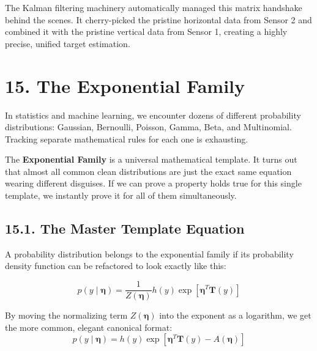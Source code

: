 \documentclass{article}
\begin{document}
The Kalman filtering machinery automatically managed this matrix handshake behind the scenes. It cherry-picked the pristine horizontal data from Sensor 2 and combined it with the pristine vertical data from Sensor 1, creating a highly precise, unified target estimation.

\section*{15. The Exponential Family}

In statistics and machine learning, we encounter dozens of different probability distributions: Gaussian, Bernoulli, Poisson, Gamma, Beta, and Multinomial. Tracking separate mathematical rules for each one is exhausting. 

The \textbf{Exponential Family} is a universal mathematical template. It turns out that almost all common clean distributions are just the exact same equation wearing different disguises. If we can prove a property holds true for this single template, we instantly prove it for all of them simultaneously.

\subsection*{15.1. The Master Template Equation}
A probability distribution belongs to the exponential family if its probability density function can be refactored to look exactly like this:

\begin{equation}
p(y \mid \boldsymbol{\eta}) = \frac{1}{Z(\boldsymbol{\eta})} h(y) \exp\left[ \boldsymbol{\eta}^T \mathbf{T}(y) \right] \tag{76}
\end{equation}

By moving the normalizing term $Z(\boldsymbol{\eta})$ into the exponent as a logarithm, we get the more common, elegant canonical format:
\begin{equation}
p(y \mid \boldsymbol{\eta}) = h(y) \exp\left[ \boldsymbol{\eta}^T \mathbf{T}(y) - A(\boldsymbol{\eta}) \right] \tag{77}
\end{equation}
\end{document}
